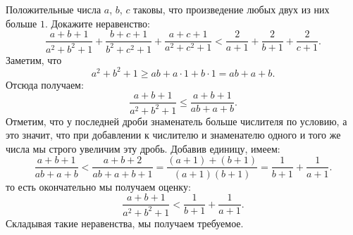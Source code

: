 \problem
Положительные числа $a$, $b$, $c$ таковы, что произведение любых двух из них
больше $1$.
Докажите неравенство:
\[
   \frac{a + b + 1}{a^2 + b^2 + 1}
   +
   \frac{b + c + 1}{b^2 + c^2 + 1}
   +
   \frac{a + c + 1}{a^2 + c^2 + 1}
<
   \frac{2}{a + 1} + \frac{2}{b + 1} + \frac{2}{c + 1}
.\]
\solution
Заметим, что
\[
   a^2 + b^2 + 1
\geq
   a b + a \cdot 1 + b \cdot 1
=
   a b + a + b
.\]
Отсюда получаем:
\[
   \frac{a + b + 1}{a^2 + b^2 + 1}
\leq
   \frac{a + b + 1}{a b + a + b}
.\]
Отметим, что у последней дроби знаменатель больше числителя по условию, а это
значит, что при добавлении к числителю и знаменателю одного и того же числа мы
строго увеличим эту дробь.
Добавив единицу, имеем:
\[
   \frac{a + b + 1}{a b + a + b}
<
   \frac{a + b + 2}{a b + a + b + 1}
=
   \frac{(a + 1) + (b + 1)}{(a + 1) (b + 1)}
=
   \frac{1}{b + 1}
   +
   \frac{1}{a + 1}
.\]
то есть окончательно мы получаем оценку:
\[
   \frac{a + b + 1}{a^2 + b^2 + 1}
<
   \frac{1}{b + 1} + \frac{1}{a + 1}
.\]
Складывая такие неравенства, мы получаем требуемое.
\endproblem
